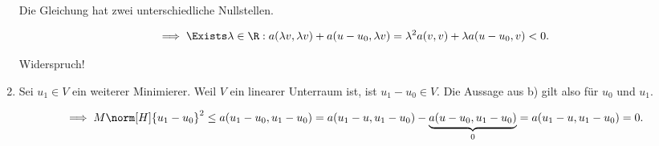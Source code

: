 \begin{solution}
\begin{enumerate}[label = \textbf{\alph*)}]
  Die Gleichung hat zwei unterschiedliche Nullstellen.

  \begin{align*}
    \implies
    \Exists \lambda \in \R:
    a(\lambda v, \lambda v) + a(u - u_0, \lambda v)
    =
    \lambda^2 a(v,v) + \lambda a(u - u_0, v) < 0.
  \end{align*}

  Widerspruch!

  \item Sei $u_1 \in V$ ein weiterer Minimierer.
  Weil $V$ ein linearer Unterraum ist, ist $u_1 - u_0 \in V$.
  Die Aussage aus b) gilt also für $u_0$ und $u_1$.

  \begin{align*}
    \implies
    M \norm[H]{u_1 - u_0}^2
    \leq
    a(u_1 - u_0, u_1 - u_0)
    =
    a(u_1 - u, u_1 - u_0)
    -
    \underbrace{a(u - u_0, u_1 - u_0)}_0
    =
    a(u_1 - u, u_1 - u_0) = 0.
  \end{align*}


\end{enumerate}
\end{solution}

